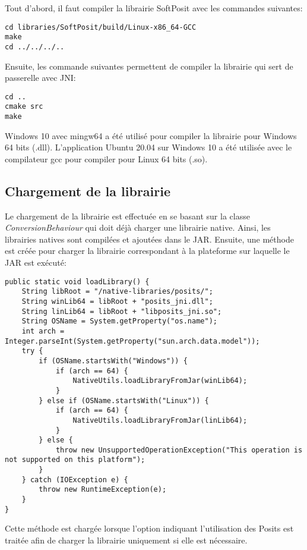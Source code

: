 \begin{minipage2}
Tout d'abord, il faut compiler la librairie \gls{SoftPosit} avec les commandes suivantes:
\begin{verbatim}
cd libraries/SoftPosit/build/Linux-x86_64-GCC
make
cd ../../../..
\end{verbatim}
\end{minipage2}

Ensuite, les commande suivantes permettent de compiler la librairie qui sert de passerelle avec \gls{JNI}:
\begin{verbatim}
cd ..
cmake src
make
\end{verbatim}

Windows 10 avec mingw64 a été utilisé pour compiler la librairie pour Windows 64 bits (.dll). L'application Ubuntu 20.04 sur Windows 10 a été utilisée avec le compilateur gcc pour compiler pour Linux 64 bits (.so).

\subsection{Chargement de la librairie}

Le chargement de la librairie est effectuée en se basant sur la classe \textit{ConversionBehaviour} qui doit déjà charger une librairie native. Ainsi, les librairies natives sont compilées et ajoutées dans le \gls{JAR}. Ensuite, une méthode est créée pour charger la librairie correspondant à la plateforme sur laquelle le \gls{JAR} est exécuté:

\begin{verbatim}
public static void loadLibrary() {
    String libRoot = "/native-libraries/posits/";
    String winLib64 = libRoot + "posits_jni.dll";
    String linLib64 = libRoot + "libposits_jni.so";
    String OSName = System.getProperty("os.name");
    int arch = Integer.parseInt(System.getProperty("sun.arch.data.model"));
    try {
        if (OSName.startsWith("Windows")) {
            if (arch == 64) {
                NativeUtils.loadLibraryFromJar(winLib64);
            }
        } else if (OSName.startsWith("Linux")) {
            if (arch == 64) {
                NativeUtils.loadLibraryFromJar(linLib64);
            }
        } else {
            throw new UnsupportedOperationException("This operation is not supported on this platform");
        }
    } catch (IOException e) {
        throw new RuntimeException(e);
    }
}
\end{verbatim}

Cette méthode est chargée lorsque l'option indiquant l'utilisation des \glspl{Posit} est traitée afin de charger la librairie uniquement si elle est nécessaire.


